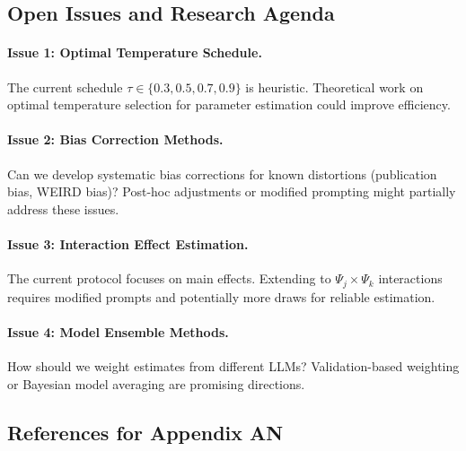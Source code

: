 
\subsection{Open Issues and Research Agenda}
\label{sec:AN-openissues}

\paragraph{Issue 1: Optimal Temperature Schedule.}
The current schedule $\tau \in \{0.3, 0.5, 0.7, 0.9\}$ is heuristic.
Theoretical work on optimal temperature selection for parameter estimation
could improve efficiency.

\paragraph{Issue 2: Bias Correction Methods.}
Can we develop systematic bias corrections for known distortions
(publication bias, WEIRD bias)? Post-hoc adjustments or modified
prompting might partially address these issues.

\paragraph{Issue 3: Interaction Effect Estimation.}
The current protocol focuses on main effects. Extending to
$\Psi_j \times \Psi_k$ interactions requires modified prompts
and potentially more draws for reliable estimation.

\paragraph{Issue 4: Model Ensemble Methods.}
How should we weight estimates from different LLMs?
Validation-based weighting or Bayesian model averaging
are promising directions.


\subsection{References for Appendix AN}
\label{sec:AN-references}

